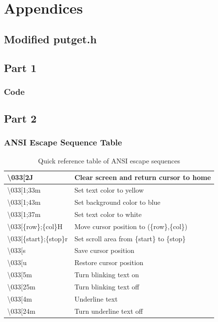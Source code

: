 \documentclass[12pt]{article}
\begin{document}
\pagebreak
\section{Appendices}
\subsection{Modified putget.h}
	
\subsection{Part 1}
	\subsubsection{Code}
		
\subsection{Part 2}
	\subsubsection{ANSI Escape Sequence Table}
		\begin{table}[h]
			\centering
			\begin{tabular}{|l|l|}
				\hline
				\textbackslash033[2J & Clear screen and return cursor to home \\ \hline
				\textbackslash033[1;33m & Set text color to yellow \\ \hline
				\textbackslash033[1;43m & Set background color to blue \\ \hline
				\textbackslash033[1;37m & Set text color to white\\ \hline
				\textbackslash033[\{row\};\{col\}H & Move cursor position to (\{row\},\{col\})\\ \hline
				\textbackslash033[\{start\};\{stop\}r & Set scroll area from \{start\} to \{stop\}\\ \hline
				\textbackslash033[s & Save cursor position\\ \hline
				\textbackslash033[u & Restore cursor position\\ \hline
				\textbackslash033[5m & Turn blinking text on\\ \hline
				\textbackslash033[25m & Turn blinking text off\\ \hline
				\textbackslash033[4m & Underline text\\ \hline
				\textbackslash033[24m & Turn underline text off\\ \hline		
				\hline
			\end{tabular}
			\caption{Quick reference table of ANSI escape sequences}
			\label{refTable}
		\end{table}
\end{document}
